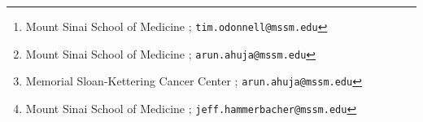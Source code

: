 \author{

Timothy O'Donnell%
  \thanks{Mount Sinai School of Medicine ; \texttt{tim.odonnell@mssm.edu}}

Arun Ahuja%
  \thanks{Mount Sinai School of Medicine ; \texttt{arun.ahuja@mssm.edu}}

Alexandra Snyder%
  \thanks{Memorial Sloan-Kettering Cancer Center ; \texttt{arun.ahuja@mssm.edu}}

Jeff Hammerbacher%
  \thanks{Mount Sinai School of Medicine ; \texttt{jeff.hammerbacher@mssm.edu}}
  
 }
